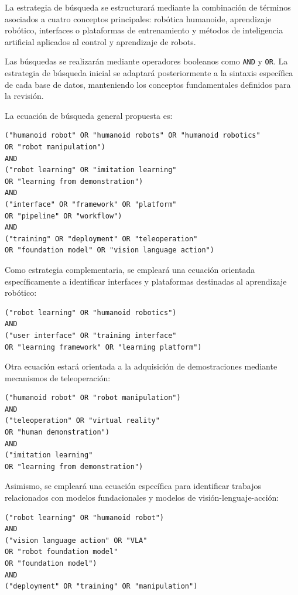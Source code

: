 \documentclass[stu,12pt,floatsintext]{apa7}
\begin{document}
La estrategia de búsqueda se estructurará mediante la combinación de términos asociados a cuatro conceptos principales: robótica humanoide, aprendizaje robótico, interfaces o plataformas de entrenamiento y métodos de inteligencia artificial aplicados al control y aprendizaje de robots.

Las búsquedas se realizarán mediante operadores booleanos como \texttt{AND} y \texttt{OR}. La estrategia de búsqueda inicial se adaptará posteriormente a la sintaxis específica de cada base de datos, manteniendo los conceptos fundamentales definidos para la revisión.

La ecuación de búsqueda general propuesta es:

\begin{verbatim}
("humanoid robot" OR "humanoid robots" OR "humanoid robotics"
OR "robot manipulation")
AND
("robot learning" OR "imitation learning"
OR "learning from demonstration")
AND
("interface" OR "framework" OR "platform"
OR "pipeline" OR "workflow")
AND
("training" OR "deployment" OR "teleoperation"
OR "foundation model" OR "vision language action")
\end{verbatim}

Como estrategia complementaria, se empleará una ecuación orientada específicamente a identificar interfaces y plataformas destinadas al aprendizaje robótico:

\begin{verbatim}
("robot learning" OR "humanoid robotics")
AND
("user interface" OR "training interface"
OR "learning framework" OR "learning platform")
\end{verbatim}

Otra ecuación estará orientada a la adquisición de demostraciones mediante mecanismos de teleoperación:

\begin{verbatim}
("humanoid robot" OR "robot manipulation")
AND
("teleoperation" OR "virtual reality"
OR "human demonstration")
AND
("imitation learning"
OR "learning from demonstration")
\end{verbatim}

Asimismo, se empleará una ecuación específica para identificar trabajos relacionados con modelos fundacionales y modelos de visión-lenguaje-acción:

\begin{verbatim}
("robot learning" OR "humanoid robot")
AND
("vision language action" OR "VLA"
OR "robot foundation model"
OR "foundation model")
AND
("deployment" OR "training" OR "manipulation")
\end{verbatim}
\end{document}
